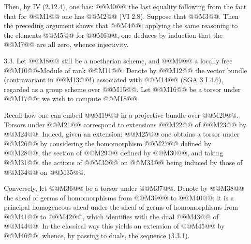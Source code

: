 
Then, by IV (2.12.4), one has:
@@M0@@
the last equality following from the fact that for @@M1@@ one has @@M2@@ (VI 2.8). Suppose that @@M3@@. Then the preceding argument shows that @@M4@@; applying the same reasoning to the elements @@M5@@ for @@M6@@, one deduces by induction that the @@M7@@ are all zero, whence injectivity.

3.3. Let @@M8@@ still be a noetherian scheme, and @@M9@@ a locally free @@M10@@-Module of rank @@M11@@. Denote by @@M12@@ the vector bundle (contravariant in @@M13@@!) associated with @@M14@@ (SGA 3 I 4.6), regarded as a group scheme over @@M15@@. Let @@M16@@ be a torsor under @@M17@@; we wish to compute @@M18@@.

Recall how one can embed @@M19@@ in a projective bundle over @@M20@@. Torsors under @@M21@@ correspond to extensions @@M22@@ of @@M23@@ by @@M24@@. Indeed, given an extension:
@@M25@@
one obtains a torsor under @@M26@@ by considering the homomorphism @@M27@@ defined by @@M28@@, the section of @@M29@@ defined by @@M30@@, and taking @@M31@@, the actions of @@M32@@ on @@M33@@ being induced by those of @@M34@@ on @@M35@@.

Conversely, let @@M36@@ be a torsor under @@M37@@. Denote by @@M38@@ the sheaf of germs of homomorphisms from @@M39@@ to @@M40@@; it is a principal homogeneous sheaf under the sheaf of germs of homomorphisms from @@M41@@ to @@M42@@, which identifies with the dual @@M43@@ of @@M44@@. In the classical way this yields an extension of @@M45@@ by @@M46@@, whence, by passing to duals, the sequence (3.3.1).

